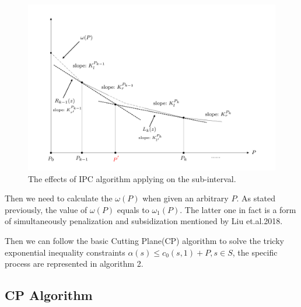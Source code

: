 \begin{figure}[h]%
	\centering  %
	\includegraphics[width=0.9\linewidth]{Figures/IPC}
	\caption{The effects of IPC algorithm applying on the sub-interval.}  %
	\label{fig:ImageIPC}   %
\end{figure}

Then we need to calculate the $\omega(P)$ when given an arbitrary $P$. As stated previously, the value of $\omega(P)$ equals to $\omega_1(P)$. The latter one in fact is a form of simultaneously penalization and subsidization mentioned by Liu et.al.2018.

Then we can follow the basic Cutting Plane(CP) algorithm to solve the tricky exponential inequality constraints $\alpha(s) \leq c_0(s,1)+P, s\in S$, the specific process are represented in algorithm 2.

\subsection{CP Algorithm}

